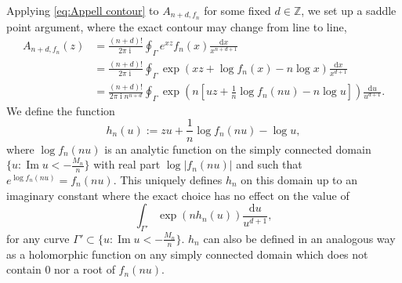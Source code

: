 \documentclass[reqno]{amsart}
\newcommand{\1}{\mathbf{1}}
\newcommand{\dd}{\mathrm{d}}
\DeclareMathOperator{\ii}{i}
\renewcommand\Im{\operatorname{Im}}
\newcommand{\Z}{\mathbb{Z}}
\theoremstyle{plain}
\theoremstyle{definition}
\theoremstyle{remark}
\numberwithin{equation}{section}
\begin{document}

Applying \eqref{eq:Appell contour} to $A_{n+d,f_n}$ for some fixed $d\in\Z$, we set up a saddle point argument, where the exact contour may change from line to line, \begin{equation}\label{eq:clean saddle point set up}
\begin{aligned}
	A_{n+d,f_n}(z)&=\frac{(n+d)!}{2\pi\ii}\oint_{\Gamma}e^{xz}f_{n}(x)\frac{\dd x}{x^{n+d+1}}\\
	&=\frac{(n+d)!}{2\pi\ii}\oint_{\Gamma}\exp\left(xz+\log f_{n}(x)-n\log x\right)\frac{\dd x}{x^{d+1}}\\
	&=\frac{(n+d)!}{2\pi\ii n^{n+d}}\oint_{\Gamma}\exp\left(n\left[uz+\frac{1}{n}\log f_{n}(nu)-n\log u\right]\right)\frac{\dd u}{u^{d+1}}.
\end{aligned}
\end{equation} We define the function \begin{equation}\label{eq:saddle point function}
h_n(u):=zu+\frac{1}{n}\log f_{n}(nu)-\log u,
\end{equation} where $\log f_{n}(nu)$ is an analytic function on the simply connected domain $\{u:\Im u<-\frac{M_n}{n}\}$ with real part $\log|f_{n}(nu)|$ and such that $e^{\log f_{n}(nu)}=f_{n}(nu)$. This uniquely defines $h_n$ on this domain up to an imaginary constant where the exact choice has no effect on the value of \begin{equation}
\int_{\Gamma'}\exp(nh_n(u))\frac{\dd u}{u^{d+1}},
\end{equation} for any curve $\Gamma'\subset\{u: \Im u<-\frac{M_n}{n} \}$. $h_n$ can also be defined in an analogous way as a holomorphic function on any simply connected domain which does not contain $0$ nor a root of $f_{n}(nu)$.   
 
\end{document}
